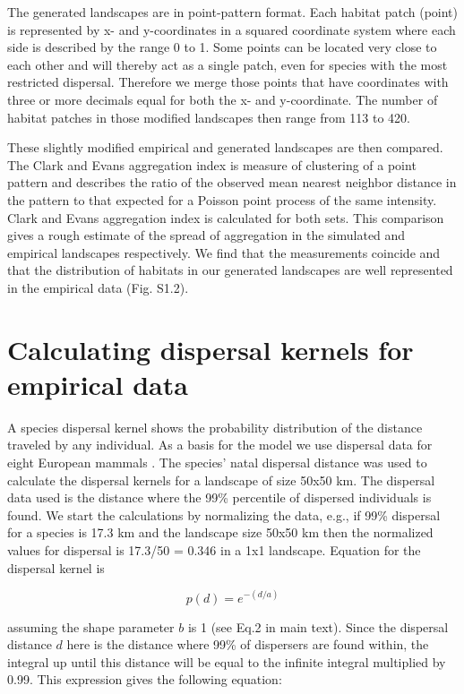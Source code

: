 \documentclass[12pt,pdftex]{article}
\begin{document}
The generated landscapes are in point-pattern format. Each habitat patch (point) is represented by x- and y-coordinates in a squared coordinate system where each side is described by the range  0 to 1. Some points can be located very close to each other and will thereby act as a single patch, even for species with the most restricted dispersal. Therefore we merge those points that have coordinates with three or more decimals equal for both the x- and y-coordinate. The number of habitat patches in those modified landscapes then range from 113 to 420.

These slightly modified empirical and generated landscapes are then compared. The Clark and Evans aggregation index \citep{Clark1954} is measure of clustering of a point pattern and describes the ratio of the observed mean nearest neighbor distance in the pattern to that expected for a Poisson point process of the same intensity. Clark and Evans aggregation index is calculated for both sets. This comparison gives a rough estimate of the spread of aggregation in the simulated and empirical landscapes respectively. We find that the measurements coincide and that the distribution of habitats in our generated landscapes are well represented in the empirical data (Fig. S1.2).

\section*{Calculating dispersal kernels for empirical data}
 A species dispersal kernel shows the probability distribution of the distance traveled by any individual. As a basis for the model we use dispersal data for eight European mammals \citep{Whitmee2013}. The species’ natal dispersal distance was used to calculate the dispersal kernels for a landscape of size 50x50 km. The dispersal data used  is the distance where the 99\% percentile of dispersed individuals is found. We start the calculations by normalizing the data, e.g., if 99\% dispersal for a species is 17.3 km and the landscape size 50x50 km then the normalized values for dispersal is 17.3/50 = 0.346 in a 1x1 landscape. Equation for the dispersal kernel is 

\begin{equation}
p(d) = e^{-(d/a)}
\end{equation}

assuming the shape parameter $b$ is 1 (see Eq.2 in main text). 
Since the dispersal distance $d$ here is the distance where 99\% of dispersers are found within, the integral up until this distance will be equal to the infinite integral multiplied by 0.99. This expression gives the following equation:
\end{document}
